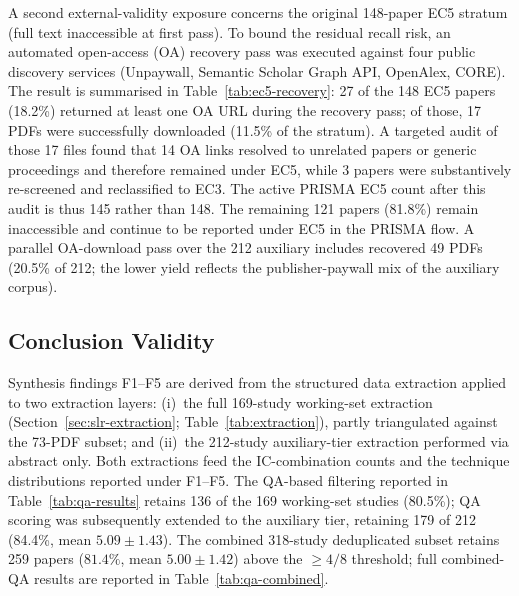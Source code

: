 





A second external-validity exposure concerns the original 148-paper EC5
stratum (full text inaccessible at first pass). To bound the residual recall
risk, an
automated open-access (OA) recovery pass was executed against four public
discovery services (Unpaywall, Semantic Scholar Graph API, OpenAlex, CORE).
The result is summarised in Table~\ref{tab:ec5-recovery}: 27 of the 148 EC5
papers (18.2\%) returned at least one OA URL during the recovery pass; of
those, 17 PDFs were successfully downloaded (11.5\% of the stratum).
A targeted audit of those 17 files found that 14 OA links resolved to
unrelated papers or generic proceedings and therefore remained under EC5,
while 3 papers were substantively re-screened and reclassified to EC3.
The active PRISMA EC5 count after this audit is thus 145 rather than 148.
The remaining 121 papers (81.8\%) remain inaccessible and continue to be
reported under EC5 in the PRISMA flow. A parallel OA-download pass over the
212 auxiliary includes recovered 49 PDFs (20.5\% of 212; the lower yield
reflects the publisher-paywall mix of the auxiliary corpus).



\subsection{Conclusion Validity}

Synthesis findings F1--F5 are derived from the structured data extraction
applied to two extraction layers: (i)~the full 169-study working-set
extraction (Section~\ref{sec:slr-extraction};
Table~\ref{tab:extraction}), partly triangulated against the 73-PDF subset;
and (ii)~the 212-study auxiliary-tier extraction performed via abstract
only. Both extractions feed
the IC-combination counts and the technique distributions reported under
F1--F5. The QA-based filtering reported in Table~\ref{tab:qa-results}
retains 136 of the 169 working-set studies (80.5\%); QA scoring was
subsequently extended to the auxiliary tier,
retaining 179 of 212 (84.4\%, mean
$5.09 \pm 1.43$). The combined 318-study deduplicated subset retains 259 papers
($81.4\%$, mean $5.00 \pm 1.42$) above the $\geq 4/8$ threshold; full
combined-QA results are reported in Table~\ref{tab:qa-combined}.

